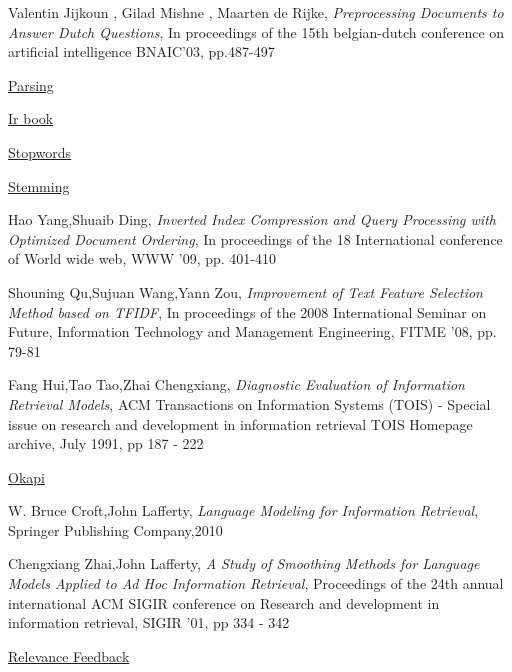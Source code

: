 \documentclass{article}
\begin{document}
		\begin{thebibliography}{99}

			 Valentin Jijkoun , Gilad Mishne , Maarten de Rijke,
			\emph{Preprocessing Documents to Answer Dutch Questions},
			In proceedings of the 15th belgian-dutch conference on artificial intelligence
			BNAIC’03,
			pp.487-497

			 \href{http://en.wikipedia.org/wiki/Parsing}{Parsing}

			 \href{http://www.ir.iit.edu/~dagr/cs529/ir_book.html}{Ir book}

			 \href{http://en.wikipedia.org/wiki/Stopwords}{Stopwords}

			 \href{http://en.wikipedia.org/wiki/Stemming}{Stemming}


			Hao Yang,Shuaib Ding,
			\emph{Inverted Index Compression and Query Processing with Optimized Document Ordering},
			In proceedings of the 18 International conference of World wide web,
			WWW '09,
			pp. 401-410

			Shouning Qu,Sujuan Wang,Yann Zou,
			\emph{Improvement of Text Feature Selection Method based on TFIDF},
			In proceedings of the 2008 International Seminar on Future,
			Information Technology and Management Engineering,
			FITME '08,
			pp. 79-81

			Fang Hui,Tao Tao,Zhai Chengxiang,
			\emph{Diagnostic Evaluation of Information Retrieval Models},
			ACM Transactions on Information Systems (TOIS) -
			Special issue on research and development in information retrieval TOIS Homepage archive,
			July 1991,
			pp 187 - 222

			\href{http://en.wikipedia.org/wiki/Okapi_BM25}{Okapi}

			W. Bruce Croft,John Lafferty,
			\emph{Language Modeling for Information Retrieval},
			Springer Publishing Company,2010

				Chengxiang Zhai,John Lafferty,
			\emph{A Study of Smoothing Methods for Language Models Applied to Ad Hoc Information Retrieval},
			Proceedings of the 24th annual international ACM SIGIR conference on Research and development in information retrieval,
			SIGIR '01,
			pp 334 - 342

			\href{http://en.wikipedia.org/wiki/Relevance_feedback}{Relevance Feedback}


\end{thebibliography}
\end{document}
